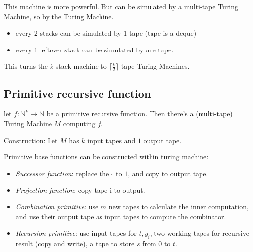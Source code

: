 This machine is more powerful. But can be simulated by a multi-tape
Turing Machine, so by the Turing Machine.

\begin{itemize}
\item
  every 2 stacks can be simulated by 1 tape (tape is a deque)
\item
  every 1 leftover stack can be simulated by one tape.
\end{itemize}

This turns the $k$-stack machine to \(\lceil\frac{k}{2}\rceil\)-tape
Turing Machines.

\subsection{Primitive recursive function}

let \(f: \mathbb{N}^k \rightarrow \mathbb{N}\) be a primitive recursive
function. Then there's a (multi-tape) Turing Machine \(M\) computing
\(f\).

Construction: Let \(M\) has \(k\) input tapes and \(1\) output tape.

Primitive base functions can be constructed within turing machine:

\begin{itemize}
\item
  \emph{Successor function}: replace the \(\square\) to \(1\), and copy
  to output tape.
\item
  \emph{Projection function}: copy tape i to output.
\item
  \emph{Combination primitive}: use \(m\) new tapes to calculate the
  inner computation, and use their output tape as input tapes to compute
  the combinator.
\item
  \emph{Recursion primitive}: use input tapes for \(t, y_i\), two
  working tapes for recursive result (copy and write), a tape to store
  \(s\) from \(0\) to \(t\).
\end{itemize}